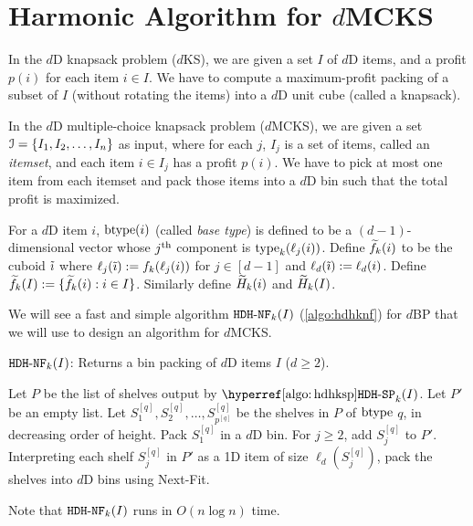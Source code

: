 \section{Harmonic Algorithm for \texorpdfstring{$d$}{d}MCKS}
\label{sec:hdhks}

In the $d$D knapsack problem ($d$KS), we are given a set $I$ of $d$D items,
and a profit $p(i)$ for each item $i \in I$. We have to compute
a maximum-profit packing of a subset of $I$ (without rotating the items)
into a $d$D unit cube (called a knapsack).

In the $d$D multiple-choice knapsack problem ($d$MCKS),
we are given a set $\mathcal{I} = \{I_1, I_2, \ldots, I_n\}$ as input,
where for each $j$, $I_j$ is a set of items, called an {\em itemset},
and each item $i \in I_j$ has a profit $p(i)$.
We have to pick at most one item from each itemset and pack those items
into a $d$D bin such that the total profit is maximized.

For a $d$D item $i$, $\operatorname{btype}(i)$ (called \emph{base type}) is defined to be
a $(d-1)$-dimensional vector whose $j^{\textrm{th}}$ component is $\operatorname{type}_k(\ell_j(i))$.
Define $\widetilde{f}_{k}(i)$ to be the cuboid $\tilde{\imath}$ where $\ell_j(\tilde{\imath}) := f_k(\ell_j(i))$
for $j \in [d-1]$ and $\ell_d(\tilde{\imath}) := \ell_d(i)$.
Define $\widetilde{f}_{k}(I) := \{\widetilde{f}_{k}(i): i \in I\}$.
Similarly define $\widetilde{H}_{k}(i)$ and $\widetilde{H}_{k}(I)$.

We will see a fast and simple algorithm $\operatorname{\mathtt{HDH-NF}}_{k}(I)$ (\cref{algo:hdhknf}) for $d$BP
that we will use to design an algorithm for $d$MCKS.

\begin{algorithm}[!ht]
\caption{$\operatorname{\mathtt{HDH-NF}}_{k}(I)$:
Returns a bin packing of $d$D items $I$ ($d \ge 2$).}
\label{algo:hdhknf}
\begin{algorithmic}[1]
\State Let $P$ be the list of shelves output by $\hdhkspHyp(I)$.
\State Let $P'$ be an empty list.
    \State Let $S_1^{[q]}, S_2^{[q]}, \ldots, S_{p^{[q]}}^{[q]}$
        be the shelves in $P$ of $\operatorname{btype}$ $q$, in decreasing order of height.
    \State Pack $S_1^{[q]}$ in a $d$D bin.
    \State For $j \ge 2$, add $S_j^{[q]}$ to $P'$.
\EndFor
\State Interpreting each shelf $S_j^{[q]}$ in $P'$ as a 1D item of size $\ell_d(S_j^{[q]})$,
    pack the shelves into $d$D bins using Next-Fit.
\end{algorithmic}
\end{algorithm}

Note that $\operatorname{\mathtt{HDH-NF}}_{k}(I)$ runs in $O(n\log n)$ time.

